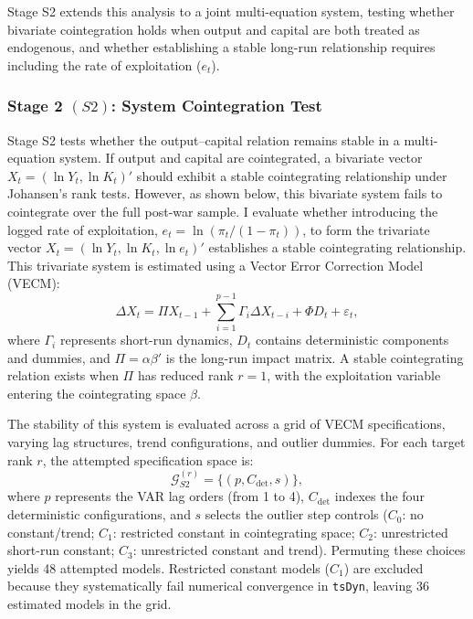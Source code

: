 Stage S2 extends this analysis to a joint multi-equation system, testing whether bivariate cointegration holds when output and capital are both treated as endogenous, and whether establishing a stable long-run relationship requires including the rate of exploitation ($e_t$).

\subsubsection{Stage 2 \texorpdfstring{$(S2)$}{}: System Cointegration Test}
\label{subsec:S2_system}

Stage S2 tests whether the output--capital relation remains stable in a multi-equation system. If output and capital are cointegrated, a bivariate vector $X_t = (\ln Y_t, \ln K_t)'$ should exhibit a stable cointegrating relationship under Johansen's rank tests. However, as shown below, this bivariate system fails to cointegrate over the full post-war sample. I evaluate whether introducing the logged rate of exploitation, $e_t = \ln(\pi_t / (1 - \pi_t))$, to form the trivariate vector $X_t = (\ln Y_t, \ln K_t, \ln e_t)'$ establishes a stable cointegrating relationship. This trivariate system is estimated using a Vector Error Correction Model (VECM):
\begin{equation}
\label{eq:vecm_johansen}
\Delta X_t = \Pi X_{t-1} + \sum_{i=1}^{p-1} \Gamma_i \Delta X_{t-i} + \Phi D_t + \varepsilon_t,
\end{equation}
where $\Gamma_i$ represents short-run dynamics, $D_t$ contains deterministic components and dummies, and $\Pi = \alpha \beta'$ is the long-run impact matrix. A stable cointegrating relation exists when $\Pi$ has reduced rank $r=1$, with the exploitation variable entering the cointegrating space $\beta$.

The stability of this system is evaluated across a grid of VECM specifications, varying lag structures, trend configurations, and outlier dummies. For each target rank $r$, the attempted specification space is:
\begin{equation}
\mathcal{G}_{S2}^{(r)} = \{(p, C_{\text{det}}, s)\},
\label{eq:G_S2}
\end{equation}
where $p$ represents the VAR lag orders (from 1 to 4), $C_{\text{det}}$ indexes the four deterministic configurations, and $s$ selects the outlier step controls ($C_0$: no constant/trend; $C_1$: restricted constant in cointegrating space; $C_2$: unrestricted short-run constant; $C_3$: unrestricted constant and trend). Permuting these choices yields 48 attempted models. Restricted constant models ($C_1$) are excluded because they systematically fail numerical convergence in \texttt{tsDyn}, leaving 36 estimated models in the grid.

